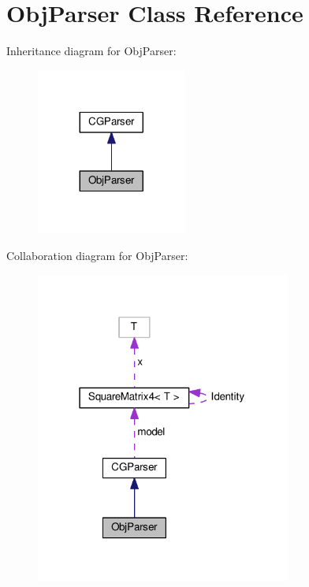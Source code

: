 \hypertarget{class_obj_parser}{}\section{Obj\+Parser Class Reference}
\label{class_obj_parser}


Inheritance diagram for Obj\+Parser\+:
\nopagebreak
\begin{figure}[H]
\begin{center}
\leavevmode
\includegraphics[width=140pt]{class_obj_parser__inherit__graph}
\end{center}
\end{figure}


Collaboration diagram for Obj\+Parser\+:
\nopagebreak
\begin{figure}[H]
\begin{center}
\leavevmode
\includegraphics[width=238pt]{class_obj_parser__coll__graph}
\end{center}
\end{figure}

